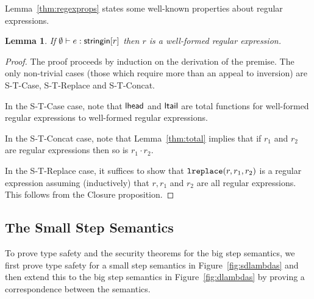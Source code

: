 \documentclass[12pt]{article}
\newtheorem{trdef}[tr]{TR Definition}
\newtheorem{lem}[thm]{Lemma}
\theoremstyle{definition}
\newcommand{\stringin}[1]{{\sf stringin}[#1]}
\newcommand{\lreplace}[3]{{\sf lreplace}(#1; #2; #3)}
\renewcommand{\lreplace}[3]{{\tt lreplace}(#1, #2, #3)}
\begin{document}
Lemma~\ref{thm:regexprops} states some well-known properties about regular expressions.

\begin{lem}
  If $\emptyset \vdash e : \stringin{r}$ then $r$ is a well-formed regular expression.
\end{lem}
\begin{proof}
  The proof proceeds by induction on the derivation of the premise.
  The only non-trivial cases (those which require more than an appeal to inversion) are S-T-Case, S-T-Replace and S-T-Concat. 

In the S-T-Case case, note that ${\sf lhead}$ and ${\sf ltail}$ are total functions for well-formed regular expressions to well-formed regular expressions.

In the S-T-Concat case, note that Lemma~\ref{thm:total} implies that if $r_1$ and $r_2$ are regular expressions then so is $r_1 \cdot r_2$.

In the S-T-Replace case, it suffices to show that $\lreplace{r}{r_1}{r_2}$ is a regular expression assuming (inductively) that $r, r_1$ and $r_2$ are all regular expressions.
This follows from the Closure proposition.
\end{proof}

\subsection{The Small Step Semantics}

To prove type safety and the security theorems for the big step semantics, we
first prove type safety for a small step semantics in Figure~\ref{fig:sdlambdas}
and then extend this to the big step semantics in Figure~\ref{fig:dlambdas} by
proving a correspondence between the semantics.





\end{document}
